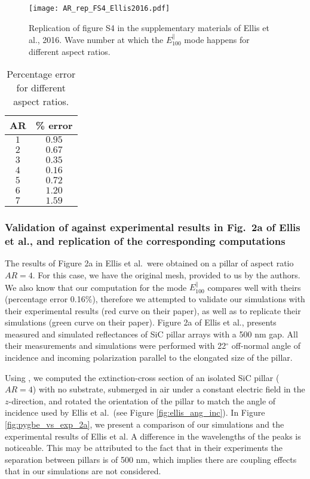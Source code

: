 \begin{figure}
    \centering
    \texttt{[image: AR\_rep\_FS4\_Ellis2016.pdf]} 
    \caption{Replication of figure S4 in the supplementary materials of Ellis et al., 2016. Wave
    number at which the $E^{\parallel}_{100}$ mode happens for different aspect ratios.}
    \label{fig:rep_FS4_ellis}
 \end{figure}
 
 \begin{table}
    \centering
    \caption{Percentage error for different aspect ratios.} 
    \label{tab:err_AR}
    \begin{tabular}{c c}
    \hline%
    AR & \% error \\
    \hline%
     $1$ & $0.95$ \\
     $2$ & $0.67$ \\
     $3$ & $0.35$ \\
     $4$ & $0.16$ \\
     $5$ & $0.72$ \\
     $6$ & $1.20$ \\
     $7$ & $1.59$ \\
    \hline%
    \end{tabular}
\end{table}

\subsubsection{Validation of \pygbe against experimental results in Fig.\ 2a  of Ellis et al., and replication of the corresponding computations}

The results of Figure 2a in Ellis et al.\ were obtained on a pillar of aspect ratio $AR=4$. For this case,
we have the original mesh, provided to us by the authors. We also know that our computation 
for the mode $E^{\parallel}_{100}$ compares well with theirs (percentage error 0.16$\%$), therefore we
attempted to validate our simulations with their experimental results (red curve on their paper), as well 
as to replicate their simulations (green curve on their paper).
Figure 2a of Ellis et al., presents measured and simulated reflectances of SiC pillar
arrays with a 500 nm gap. All their measurements and simulations were performed with 
22$^\circ$ off-normal angle of incidence and incoming polarization parallel to the 
elongated size of the pillar. 

Using \pygbe, we computed the extinction-cross section of an isolated SiC pillar ($AR=4$)
with no substrate, submerged in air under a constant electric field in the $z$-direction, 
and rotated the orientation of the pillar to match the angle of incidence used by Ellis et al.\ (see Figure \ref{fig:ellis_ang_inc}).
In Figure \ref{fig:pygbe_vs_exp_2a}, we present a 
comparison of our simulations and the experimental results of Ellis et al. A 
difference in the wavelengths of the peaks is noticeable. This may be attributed to the
fact that in their experiments the separation between pillars is of 500 nm, which implies
there are coupling effects that in our simulations are not considered.  

